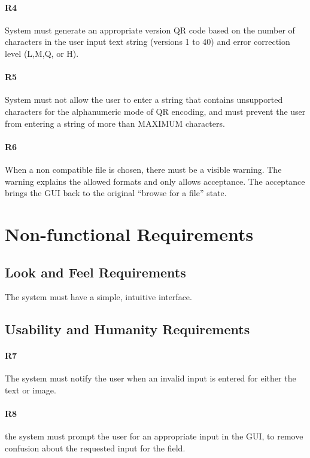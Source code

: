 \documentclass[12pt, titlepage]{article}
\begin{document}
	\paragraph{R4}
	System must generate an appropriate version QR code based on the number of 
	characters in the user input text string (versions 1 to 40) and error 
	correction level (L,M,Q, or H).
	\paragraph{R5}
	System must not allow the user to enter a string that contains unsupported 
	characters for the alphanumeric mode of QR encoding, and must prevent the 
	user from entering a string of more than MAXIMUM characters.
	\paragraph{R6}	
	When a non compatible file is chosen, there must be a visible warning. The 
	warning explains the allowed formats and only allows acceptance. The 
	acceptance brings the GUI back to the original “browse for a file” state.
	
	

\section{Non-functional Requirements}

\subsection{Look and Feel Requirements}
	
	The system must have a simple, intuitive interface.
	
	
\subsection{Usability and Humanity Requirements}

\paragraph{R7}
	The system must notify the user when an invalid input is entered for either 
	the text or image.
	\paragraph{R8}
	the system must prompt the user for an appropriate input in the GUI, to 
	remove confusion about the requested input for the field.
\end{document}
